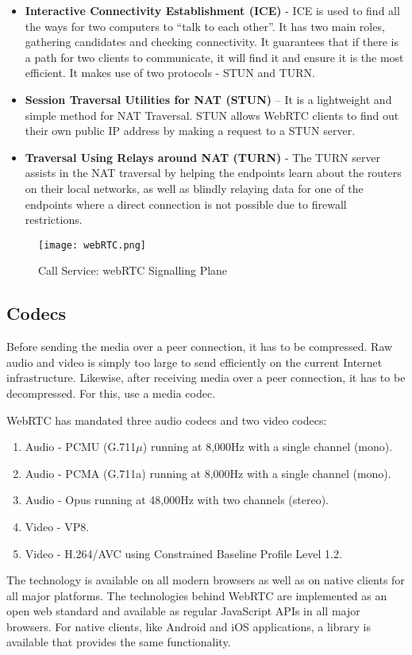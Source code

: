\begin{itemize}
    \item \textbf{Interactive Connectivity Establishment (ICE)} - ICE is used to find all the ways 
    for two computers to “talk to each other”. It has two main roles, gathering candidates 
    and checking connectivity. It guarantees that if there is a path for two clients to communicate, 
    it will find it and ensure it is the most efficient. It makes use of two protocols - STUN and TURN.
    \item  \textbf{Session Traversal Utilities for NAT (STUN)}  – It is a lightweight and simple 
    method for NAT Traversal. STUN allows WebRTC clients to find out their own public IP address 
    by making a request to a STUN server. 
    \item  \textbf{Traversal Using Relays around NAT (TURN) }  - The TURN server assists in the NAT 
    traversal by helping the endpoints learn about the routers on their local networks, 
    as well as blindly relaying data for one of the endpoints where a direct connection is 
    not possible due to firewall restrictions.
\end{itemize}

\begin{figure}
\begin{center}
    \texttt{[image: webRTC.png]}
\end{center}
\caption{Call Service: webRTC Signalling Plane}
\label{fig:webrtc}
\end{figure}

\subsection{Codecs}

Before sending the media over a peer connection, it has to be compressed. 
Raw audio and video is simply too large to send efficiently on the current Internet infrastructure.
Likewise, after receiving media over a peer connection, it has to be decompressed. 
For this, use a media codec.

WebRTC has mandated three audio codecs and two video codecs:

\begin{enumerate}
    \item Audio - PCMU (G.711$\mu$) running at 8,000Hz with a single channel (mono).
    \item Audio - PCMA (G.711a) running at 8,000Hz with a single channel (mono).
    \item Audio - Opus running at 48,000Hz with two channels (stereo).
    \item Video - VP8.
    \item Video - H.264/AVC using Constrained Baseline Profile Level 1.2.
\end{enumerate} 

The technology is available on all modern browsers as well as on native clients for
all major platforms. The technologies behind WebRTC are implemented as an open web 
standard and available as regular JavaScript APIs in all major browsers. For native clients, 
like Android and iOS applications, a library is available that provides the same 
functionality.~\cite{UltimateGuideWebRTC}

